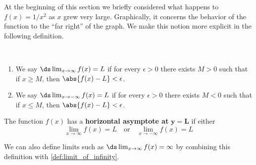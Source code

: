 At the beginning of this section we briefly considered what happens to $f(x) = 1/x^2$ as $x$ grew very large. 
Graphically, it concerns the behavior of the function to the ``far right'' of the graph. We make this notion more explicit in the following definition.

\begin{definition}\label{def:limit_at_infinity}%
~\\[-2\baselineskip]\begin{enumerate}
\item We say $\ds\lim_{x\to\infty} f(x)=L$ if for every $\epsilon>0$ there exists $M>0$ such that if $x\geq M$, then $\abs{f(x)-L}<\epsilon$.

\item We say $\ds\lim_{x\to-\infty} f(x)=L$ if for every $\epsilon>0$ there exists $M<0$ such that if $x\leq M$, then $\abs{f(x)-L}<\epsilon$.

\end{enumerate}
\end{definition}

\begin{definition}\label{def:horiz_asymp}%
The function $f(x)$ has a \textbf{horizontal asymptote at} $\mathbf{y=L}$ if either
\[\lim_{x\to \infty} f(x)=L \quad \text{or} \quad \lim_{x\to -\infty} f(x)=L\]
\end{definition}

We can also define limits such as $\ds\lim_{x\to\infty}f(x)=\infty$ by combining this definition with \autoref{def:limit_of_infinity}. %

